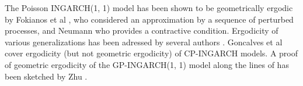 \documentclass{article}
\begin{document}
The Poisson INGARCH(1, 1) model has been shown to be geometrically ergodic by Fokianos et al \cite{Fokianos2009}, who considered an approximation by a sequence of perturbed processes, and Neumann \cite{Neumann2011} who provides a contractive condition. Ergodicity of various generalizations has been adressed by several authors \citep{Davis2016, Douc2013, Neumann2011}. Goncalves et al \citep{Goncalves2015} cover ergodicity (but not geometric ergodicity) of CP-INGARCH models. A proof of geometric ergodicity of the GP-INGARCH(1, 1) model along the lines of \cite{Neumann2011} has been sketched by Zhu \citep{Zhu2012}. %
\end{document}
